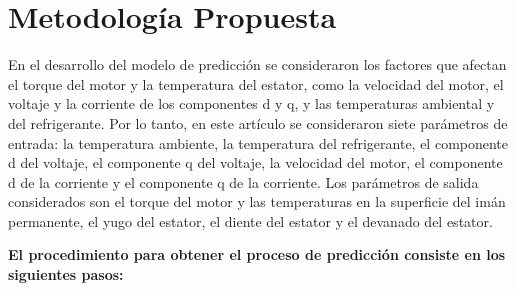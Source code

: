 \documentclass{article}
\begin{document}
\section{Metodología Propuesta}

En el desarrollo del modelo de predicción se consideraron los factores que afectan el torque del motor y la temperatura del estator, como la velocidad del motor, el voltaje y la corriente de los componentes d y q, y las temperaturas ambiental y del refrigerante. Por lo tanto, en este artículo se consideraron siete parámetros de entrada: la temperatura ambiente, la temperatura del refrigerante, el componente d del voltaje, el componente q del voltaje, la velocidad del motor, el componente d de la corriente y el componente q de la corriente. Los parámetros de salida considerados son el torque del motor y las temperaturas en la superficie del imán permanente, el yugo del estator, el diente del estator y el devanado del estator.

\textbf{El procedimiento para obtener el proceso de predicción consiste en los siguientes pasos:}
\end{document}
